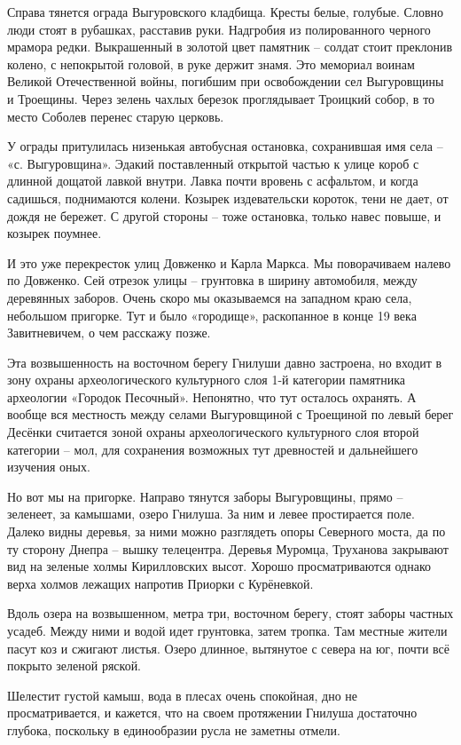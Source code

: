 Справа тянется ограда Выгуровского кладбища. Кресты белые, голубые. Словно люди стоят в рубашках, расставив руки. Надгробия из полированного черного мрамора редки. Выкрашенный в золотой цвет памятник – солдат стоит преклонив колено, с непокрытой головой, в руке держит знамя. Это мемориал воинам Великой Отечественной войны, погибшим при освобождении сел Выгуровщины и Троещины. Через зелень чахлых березок проглядывает Троицкий собор, в то место Соболев перенес старую церковь.

У ограды притулилась низенькая автобусная остановка, сохранившая имя села – «с. Выгуровщина». Эдакий поставленный открытой частью к улице короб с длинной дощатой лавкой внутри. Лавка почти вровень с асфальтом, и когда садишься, поднимаются колени. Козырек издевательски короток, тени не дает, от дождя не бережет. С другой стороны – тоже остановка, только навес повыше, и козырек поумнее.

И это уже перекресток улиц Довженко и Карла Маркса. Мы поворачиваем налево по Довженко. Сей отрезок улицы – грунтовка в ширину автомобиля, между деревянных заборов. Очень скоро мы оказываемся на западном краю села, небольшом пригорке. Тут и было «городище», раскопанное в конце 19 века Завитневичем, о чем расскажу позже.

Эта возвышенность на восточном берегу Гнилуши давно застроена, но входит в зону охраны археологического культурного слоя 1-й категории памятника археологии «Городок Песочный». Непонятно, что тут осталось охранять. А вообще вся местность между селами Выгуровщиной с Троещиной по левый берег Десёнки считается зоной охраны археологического культурного слоя второй категории – мол, для сохранения возможных тут древностей и дальнейшего изучения оных.

Но вот мы на пригорке. Направо тянутся заборы Выгуровщины, прямо – зеленеет, за камышами, озеро Гнилуша. За ним и левее простирается поле. Далеко видны деревья, за ними можно разглядеть опоры Северного моста, да по ту сторону Днепра – вышку телецентра. Деревья Муромца, Труханова закрывают вид на зеленые холмы Кирилловских высот. Хорошо просматриваются однако верха холмов лежащих напротив Приорки с Курёневкой. 

Вдоль озера на возвышенном, метра три, восточном берегу, стоят заборы частных усадеб. Между ними и водой идет грунтовка, затем тропка. Там местные жители пасут коз и сжигают листья. Озеро длинное, вытянутое с севера на юг, почти всё покрыто зеленой ряской.

Шелестит густой камыш, вода в плесах очень спокойная, дно не просматривается, и кажется, что на своем протяжении Гнилуша достаточно глубока, поскольку в единообразии русла не заметны отмели.


